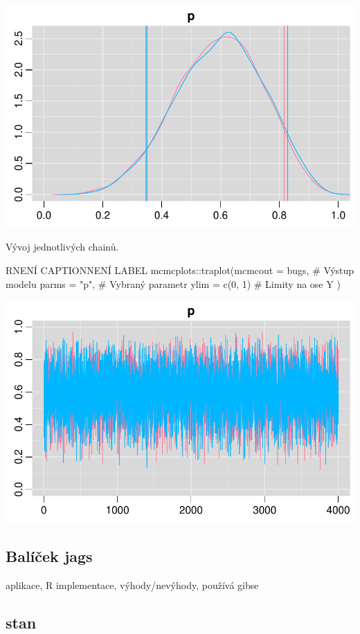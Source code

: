 \documentclass[
  11pt,
  a4paper]{report}
\begin{document}
\includegraphics{index_files/figure-pdf/unnamed-chunk-7-1.pdf}

Vývoj jednotlivých chainů.

\begin{code}{R}{NENÍ CAPTION}{NENÍ LABEL}
mcmcplots::traplot(mcmcout = bugs, # Výstup modelu
                   parms = "p",    # Vybraný parametr
                   ylim = c(0, 1)  # Limity na ose Y
)
\end{code}

\includegraphics{index_files/figure-pdf/unnamed-chunk-8-1.pdf}

\subsection{Balíček jags}\label{baluxedux10dek-jags}

aplikace, R implementace, výhody/nevýhody, používá gibse

\subsection{stan}\label{stan}
\end{document}
